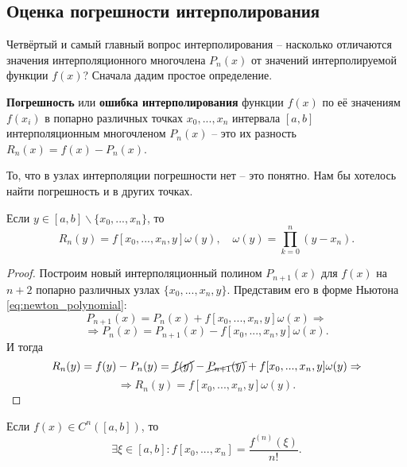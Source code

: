 \documentclass[../main.tex]{subfile}
\begin{document}
\subsection{Оценка погрешности интерполирования}
Четвёртый и самый главный вопрос интерполирования -- насколько отличаются
значения интерполяционного многочлена $P_n(x)$ от значений интерполируемой
функции $f(x)$? Сначала дадим простое определение.

\begin{define}\label{eq:interpolation_error}
	\textbf{Погрешность} или \textbf{ошибка интерполирования} функции $f(x)$
	по её значениям $f(x_i)$ в попарно различных точках $x_0,...,x_n$
	интервала $[a,b]$ интерполяционным многочленом $P_n(x)$ -- это их
	разность $\boxed{R_n(x)=f(x)-P_n(x)}$.
\end{define}

То, что в узлах интерполяции погрешности нет -- это понятно. Нам бы хотелось
найти погрешность и в других точках.

\begin{lemma}\label{eq:interpolation_error_form}
	Если $y\in[a,b]\backslash\{x_0,...,x_n\}$, то
	\[R_n(y)=f[x_0,...,x_n,y]\omega(y),\quad
	\omega(y)=\prod_{k=0}^{n}(y-x_n).\]
\end{lemma}

\begin{proof}
	Построим новый интерполяционный полином $P_{n+1}(x)$ для $f(x)$ на
	$n+2$ попарно различных узлах $\{x_0,...,x_n,y\}$. Представим его в
	форме Ньютона \eqref{eq:newton_polynomial}:
	\[P_{n+1}(x)=P_n(x)+f[x_0,...,x_n,y]\omega(x)\Rightarrow\]
	\[\Rightarrow P_n(x)=P_{n+1}(x)-f[x_0,...,x_n,y]\omega(x).\]
	И тогда
	\[R_n(y)=f(y)-P_n(y)=\cancel{f(y)}-\cancel{P_{n+1}(y)}+f[x_0,...,x_n,y]
	\omega(y)\Rightarrow\]
	\[\Rightarrow \boxed{R_n(y)=f[x_0,...,x_n,y]\omega(y)}.\]
\end{proof}

\begin{lemma}\label{eq:xi_in_ab}
	Если $f(x)\in C^n([a,b])$, то
	\[\exists\xi\in[a,b]:f[x_0,...,x_n] = \frac{f^{(n)}(\xi)}{n!}.\]
\end{lemma}
\end{document}
